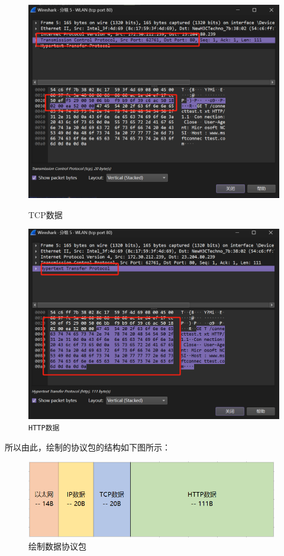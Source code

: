 \documentclass{article}
\begin{document}
	\begin{figure}[H]
		\centering
		\begin{minipage}[b]{0.45\textwidth}
			\includegraphics[width=\textwidth]{images/10.TCP数据.png}
			\caption{TCP数据}
		\end{minipage}
		\hfill
		\begin{minipage}[b]{0.45\textwidth}
			\includegraphics[width=\textwidth]{images/11.HTTP数据.png}
			\caption{\texttt{HTTP数据}}
		\end{minipage}
	\end{figure}
	
	所以由此，绘制的协议包的结构如下图所示：
	
	\begin{figure}[H]
		\centering
		\includegraphics[width=11cm]{images/12.绘制数据协议包.jpg}
		\caption{绘制数据协议包}
	\end{figure}
	
\end{document}
